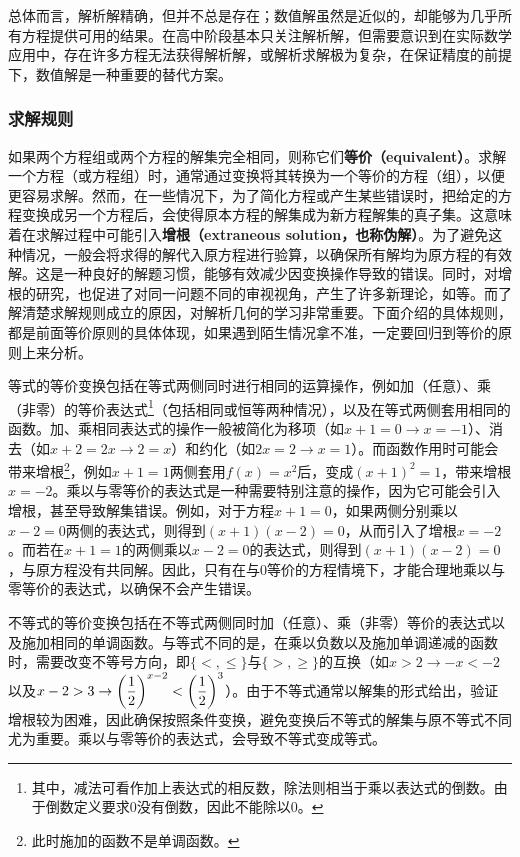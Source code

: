 总体而言，解析解精确，但并不总是存在；数值解虽然是近似的，却能够为几乎所有方程提供可用的结果。在高中阶段基本只关注解析解，但需要意识到在实际数学应用中，存在许多方程无法获得解析解，或解析求解极为复杂，在保证精度的前提下，数值解是一种重要的替代方案。

\subsubsection{求解规则}

如果两个方程组或两个方程的解集完全相同，则称它们\textbf{等价（equivalent）}。求解一个方程（或方程组）时，通常通过变换将其转换为一个等价的方程（组），以便更容易求解。然而，在一些情况下，为了简化方程或产生某些错误时，把给定的方程变换成另一个方程后，会使得原本方程的解集成为新方程解集的真子集。这意味着在求解过程中可能引入\textbf{增根（extraneous solution，也称伪解）}。为了避免这种情况，一般会将求得的解代入原方程进行验算，以确保所有解均为原方程的有效解。这是一种良好的解题习惯，能够有效减少因变换操作导致的错误。同时，对增根的研究，也促进了对同一问题不同的审视视角，产生了许多新理论，如等。而了解清楚求解规则成立的原因，对解析几何的学习非常重要。下面介绍的具体规则，都是前面等价原则的具体体现，如果遇到陌生情况拿不准，一定要回归到等价的原则上来分析。

等式的等价变换包括在等式两侧同时进行相同的运算操作，例如加（任意）、乘（非零）的等价表达式\footnote{其中，减法可看作加上表达式的相反数，除法则相当于乘以表达式的倒数。由于倒数定义要求$0$没有倒数，因此不能除以$0$。}（包括相同或恒等两种情况），以及在等式两侧套用相同的函数。加、乘相同表达式的操作一般被简化为移项（如$x+1=0\to x=-1$）、消去（如$x+2=2x\to 2=x$）和约化（如$2x=2\to x=1$）。而函数作用时可能会带来增根\footnote{此时施加的函数不是单调函数。}，例如$x+1=1$两侧套用$f(x)=x^2$后，变成$(x+1)^2=1$，带来增根$x=-2$。乘以与零等价的表达式是一种需要特别注意的操作，因为它可能会引入增根，甚至导致解集错误。例如，对于方程$x+1=0$，如果两侧分别乘以$x-2=0$两侧的表达式，则得到$(x+1)(x-2)=0$，从而引入了增根$x=-2$。而若在$x+1=1$的两侧乘以$x-2=0$的表达式，则得到$(x+1)(x-2)=0$，与原方程没有共同解。因此，只有在与$0$等价的方程情境下，才能合理地乘以与零等价的表达式，以确保不会产生错误。

不等式的等价变换包括在不等式两侧同时加（任意）、乘（非零）等价的表达式以及施加相同的单调函数。与等式不同的是，在乘以负数以及施加单调递减的函数时，需要改变不等号方向，即$\{<,\leq\}$与$\{>,\geq\}$的互换（如$x>2\to-x<-2$以及$\displaystyle x-2>3\to\left({1\over2}\right)^{x-2}<\left({1\over2}\right)^3$）。由于不等式通常以解集的形式给出，验证增根较为困难，因此确保按照条件变换，避免变换后不等式的解集与原不等式不同尤为重要。乘以与零等价的表达式，会导致不等式变成等式。

